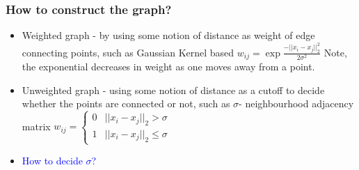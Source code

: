 \documentclass{article}
\newcommand{\blue}[1]{\textcolor{blue}{#1}}
\begin{document}
\subsubsection{How to construct the graph?}
\begin{itemize}
    \item Weighted graph - by using some notion of distance as weight of edge connecting points, such as Gaussian Kernel based $w_{ij} = \exp{\frac{-||x_i-x_j||_2^2}{2\sigma^2}}$
    Note, the exponential decreases in weight as one moves away from a point.
    \item Unweighted graph - using some notion of distance as a cutoff to decide whether the points are connected or not, such as $\sigma$- neighbourhood adjacency matrix $w_{ij} = \begin{cases} 0 & ||x_i-x_j||_2 > \sigma \\ 1 & ||x_i-x_j||_2 \leq \sigma \end{cases}$
    \item \blue{How to decide $\sigma$?}
\end{itemize}
\end{document}
